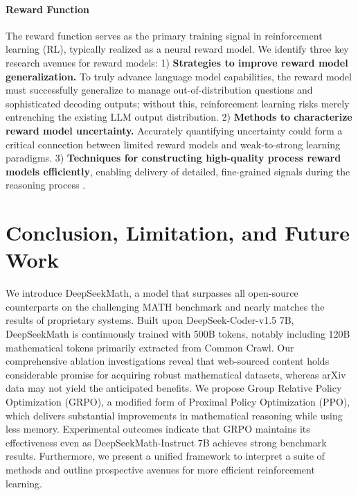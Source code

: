 \begin{itemize}[topsep=0pt]
\paragraph{Reward Function} The reward function serves as the primary training signal in reinforcement learning (RL), typically realized as a neural reward model. We identify three key research avenues for reward models: 1) \textbf{Strategies to improve reward model generalization.} To truly advance language model capabilities, the reward model must successfully generalize to manage out-of-distribution questions and sophisticated decoding outputs; without this, reinforcement learning risks merely entrenching the existing LLM output distribution. 2) \textbf{Methods to characterize reward model uncertainty.} Accurately quantifying uncertainty could form a critical connection between limited reward models and weak-to-strong learning paradigms. 3) \textbf{Techniques for constructing high-quality process reward models efficiently}, enabling delivery of detailed, fine-grained signals during the reasoning process \citep{lightman2023let,wang2023math}.

\section{Conclusion, Limitation, and Future Work}
We introduce DeepSeekMath, a model that surpasses all open-source counterparts on the challenging MATH benchmark and nearly matches the results of proprietary systems. Built upon DeepSeek-Coder-v1.5 7B, DeepSeekMath is continuously trained with 500B tokens, notably including 120B mathematical tokens primarily extracted from Common Crawl. Our comprehensive ablation investigations reveal that web-sourced content holds considerable promise for acquiring robust mathematical datasets, whereas arXiv data may not yield the anticipated benefits. We propose Group Relative Policy Optimization (GRPO), a modified form of Proximal Policy Optimization (PPO), which delivers substantial improvements in mathematical reasoning while using less memory. Experimental outcomes indicate that GRPO maintains its effectiveness even as DeepSeekMath-Instruct 7B achieves strong benchmark results. Furthermore, we present a unified framework to interpret a suite of methods and outline prospective avenues for more efficient reinforcement learning.


\end{itemize}
